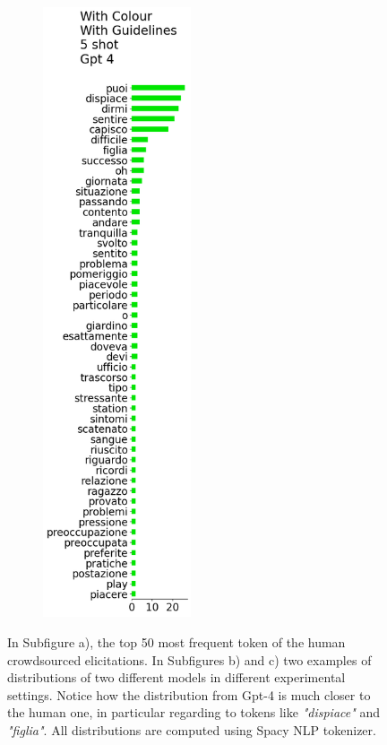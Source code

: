 \begin{figure}[!htbp]
\begin{subfigure}[t]{0.2\textwidth}
        \includegraphics[height=18cm]{assets/imgs/tokens-vertical/token_distribution_with_color_with_guidelines_5_shot_gpt-4.png}
            \label{sub:persona-narrative-elicitation-comparison-distribution-gpt-4}
    \end{subfigure}
    \caption{In Subfigure a), the top 50 most frequent token of the human crowdsourced elicitations. In Subfigures b) and c) two examples of distributions of two different models in different experimental settings. Notice how the distribution from Gpt-4 is much closer to the human one, in particular regarding to tokens like \emph{"dispiace"} and \emph{"figlia"}. All distributions are computed using Spacy NLP tokenizer.}
    \label{fig:persona-narrative-elicitation-comparison-distribution}
\end{figure}

